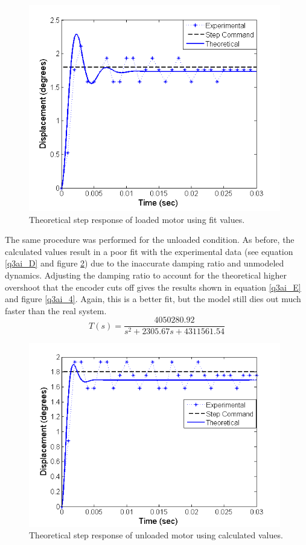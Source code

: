 \documentclass{article}
\theoremstyle{plain}
\theoremstyle{definition}
\theoremstyle{remark}
\begin{document}
\begin{figure}[hbt]
\begin{center}
\includegraphics[width = 11cm]{LoadedStepFit.png}
\caption{Theoretical step response of loaded motor using fit values.}
\label{q3ai_2}
\end{center}
\end{figure}
\vspace{5mm}
The same procedure was performed for the unloaded condition. As before, the calculated values result in a poor fit with the experimental data (see equation \ref{q3ai_D} and figure \ref{q3ai_3})  due to the inaccurate damping ratio and unmodeled dynamics. Adjusting the damping ratio to account for the theoretical higher overshoot that the encoder cuts off gives the results shown in equation \ref{q3ai_E} and figure \ref{q3ai_4}. Again, this is a better fit, but the model still dies out much faster than the real system.\\

\begin{equation}
\label{q3ai_D}
T(s) = \frac{4050280.92}{s^2 + 2305.67 s + 4311561.54}
\end{equation}

\begin{figure}[hbt]
\begin{center}
\includegraphics[width = 11cm]{UnloadedStepUnFit.png}
\caption{Theoretical step response of unloaded motor using calculated values.}
\label{q3ai_3}
\end{center}
\end{figure}
\end{document}
